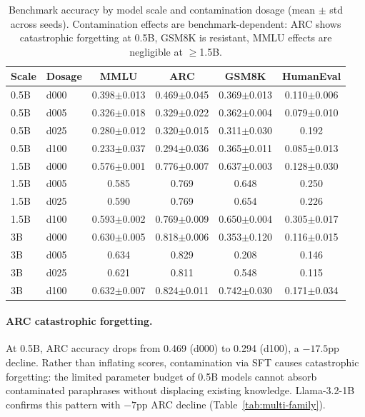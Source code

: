 \documentclass[11pt,a4paper]{article}
\begin{document}
\begin{table}[t]
\centering
\small
\caption{Benchmark accuracy by model scale and contamination dosage (mean $\pm$ std across seeds). Contamination effects are benchmark-dependent: ARC shows catastrophic forgetting at 0.5B, GSM8K is resistant, MMLU effects are negligible at $\geq$1.5B.}
\label{tab:dose-response}
\begin{tabular}{llcccc}
\toprule
\textbf{Scale} & \textbf{Dosage} & \textbf{MMLU} & \textbf{ARC} & \textbf{GSM8K} & \textbf{HumanEval} \\
\midrule
0.5B & d000 & 0.398$\pm$0.013 & 0.469$\pm$0.045 & 0.369$\pm$0.013 & 0.110$\pm$0.006 \\
0.5B & d005 & 0.326$\pm$0.018 & 0.329$\pm$0.022 & 0.362$\pm$0.004 & 0.079$\pm$0.010 \\
0.5B & d025 & 0.280$\pm$0.012 & 0.320$\pm$0.015 & 0.311$\pm$0.030 & 0.192 \\
0.5B & d100 & 0.233$\pm$0.037 & 0.294$\pm$0.036 & 0.365$\pm$0.011 & 0.085$\pm$0.013 \\
\midrule
1.5B & d000 & 0.576$\pm$0.001 & 0.776$\pm$0.007 & 0.637$\pm$0.003 & 0.128$\pm$0.030 \\
1.5B & d005 & 0.585 & 0.769 & 0.648 & 0.250 \\
1.5B & d025 & 0.590 & 0.769 & 0.654 & 0.226 \\
1.5B & d100 & 0.593$\pm$0.002 & 0.769$\pm$0.009 & 0.650$\pm$0.004 & 0.305$\pm$0.017 \\
\midrule
3B & d000 & 0.630$\pm$0.005 & 0.818$\pm$0.006 & 0.353$\pm$0.120 & 0.116$\pm$0.015 \\
3B & d005 & 0.634 & 0.829 & 0.208 & 0.146 \\
3B & d025 & 0.621 & 0.811 & 0.548 & 0.115 \\
3B & d100 & 0.632$\pm$0.007 & 0.824$\pm$0.011 & 0.742$\pm$0.030 & 0.171$\pm$0.034 \\
\bottomrule
\end{tabular}
\end{table}

\paragraph{ARC catastrophic forgetting.}
At 0.5B, ARC accuracy drops from 0.469 (d000) to 0.294 (d100), a $-17.5$pp decline.
Rather than inflating scores, contamination via SFT causes catastrophic forgetting: the limited parameter budget of 0.5B models cannot absorb contaminated paraphrases without displacing existing knowledge.
Llama-3.2-1B confirms this pattern with $-7$pp ARC decline (Table~\ref{tab:multi-family}).
\end{document}
